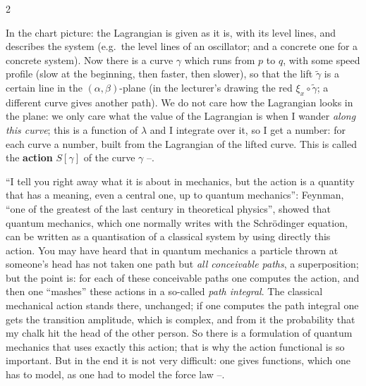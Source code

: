 \begin{paracol}{2}
\begin{intuition}\label{int:lag-actionpic}
In the chart picture: the Lagrangian is given as it is, with its level lines, and describes the system (e.g.\ the level lines of an oscillator; and a concrete one for a concrete system). Now there is a curve $\gamma$ which runs from $p$ to $q$, with some speed profile (slow at the beginning, then faster, then slower), so that the lift $\tilde\gamma$ is a certain line in the $(\alpha,\beta)$-plane (in the lecturer's drawing the red $\xi_x\circ\tilde\gamma$; a different curve gives another path). We do not care how the Lagrangian looks in the plane: we only care what the value of the Lagrangian is when I wander \emph{along this curve}; this is a function of $\lambda$ and I integrate over it, so I get a number: for each curve a number, built from the Lagrangian of the lifted curve. This is called the \textbf{action} $S[\gamma]$ of the curve $\gamma$ --.
\end{intuition}

\begin{aside}\label{as:lag-feynman}
``I tell you right away what it is about in mechanics, but the action is a quantity that has a meaning, even a central one, up to quantum mechanics'': Feynman, ``one of the greatest of the last century in theoretical physics'', showed that quantum mechanics, which one normally writes with the Schr\"odinger equation, can be written as a quantisation of a classical system by using directly this action. You may have heard that in quantum mechanics a particle thrown at someone's head has not taken one path but \emph{all conceivable paths}, a superposition; but the point is: for each of these conceivable paths one computes the action, and then one ``mashes'' these actions in a so-called \emph{path integral}.
The classical mechanical action stands there, unchanged; if one computes the path integral one gets the transition amplitude, which is complex, and from it the probability that my chalk hit the head of the other person. So there is a formulation of quantum mechanics that uses exactly this action; that is why the action functional is so important. But in the end it is not very difficult: one gives functions, which one has to model, as one had to model the force law --.
\end{aside}


\end{paracol}
